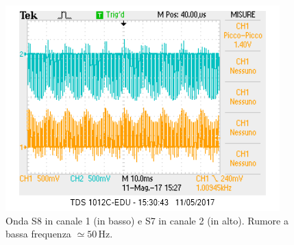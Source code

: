 \documentclass[10pt,a4paper]{article}
\begin{document}
\begin{figure}[!htb]
  \centering
  \includegraphics[scale=0.75]{perFedech1S8-ch2S7.png}
\caption{Onda S8 in canale 1 (in basso) e S7 in canale 2 (in alto). Rumore a bassa frequenza $\simeq 50\,\mbox{Hz}$.\label{osc:rumore50hz}}
\end{figure}
\end{document}
